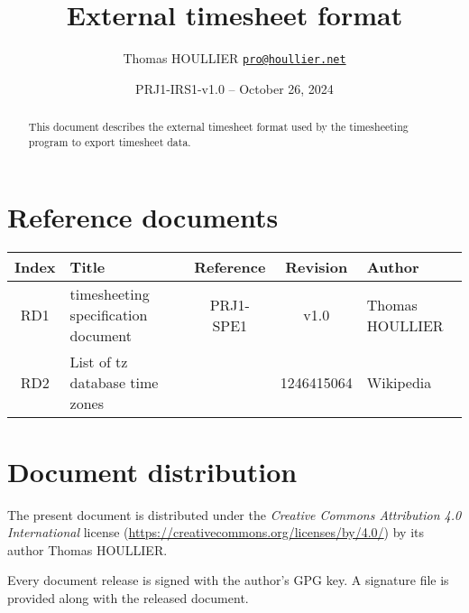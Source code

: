 \documentclass[letterpaper]{article}
\title{External timesheet format}
\author{Thomas HOULLIER \href{mailto:pro@houllier.net}
         {\texttt{\textlangle pro@houllier.net\textrangle}}}
\begin{document}
\frenchspacing
\date{PRJ1-IRS1-v1.0 -- October 26, 2024}
\maketitle
\thispagestyle{FirstPage}

\begin{abstract}
  This document describes the external timesheet format used by the
  timesheeting program to export timesheet data.
\end{abstract}

\begin{versionhistory}
\end{versionhistory}
\setcounter{table}{0} %

\section*{Reference documents}
{ \centering
  \begin{tabularx}{\textwidth}{| c | X | c | c | X |} \hline
    Index & Title & Reference & Revision & Author \\ \hline
    RD1 & timesheeting specification document & PRJ1-SPE1 & v1.0 & Thomas
    HOULLIER \\ \hline
    RD2 & List of tz database time zones &
    \cite{wiki:tz_list} & 1246415064 & Wikipedia \\ \hline
  \end{tabularx} \par }

\section*{Document distribution}
The present document is distributed under the \emph{Creative Commons Attribution
  4.0 International} license (\url{https://creativecommons.org/licenses/by/4.0/})
by its author Thomas HOULLIER.

Every document release is signed with the author's GPG key. A signature file
is provided along with the released document.

\tableofcontents
\printglossary[type=\acronymtype,style=index]
\pagestyle{plain}





\appendix


\apptocmd{\thebibliography}{\raggedright}{}{}
\begingroup
{}
\setlength\bibitemsep{0pt}
\printbibliography
\endgroup
\end{document}
